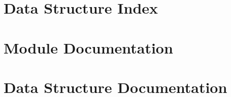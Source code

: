 \documentclass[twoside]{book}
\newcommand{\+}{\discretionary{\mbox{\scriptsize$\hookleftarrow$}}{}{}}
\newcommand{\clearemptydoublepage}{%
  \newpage{\pagestyle{empty}\cleardoublepage}%
}
\begin{document}
\chapter{Data Structure Index}

\chapter{Module Documentation}


\chapter{Data Structure Documentation}














\backmatter
\newpage
{}
\clearemptydoublepage
{}
\printindex
\end{document}

